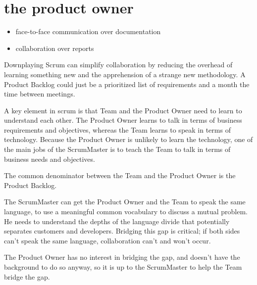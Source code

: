 \pagebreak
\chapter{the product owner}


\begin{itemize}
  \item face-to-face communication over documentation
  \item collaboration over reports
\end{itemize}

Downplaying Scrum can simplify collaboration by reducing the overhead of learning something new and the apprehension of a strange new methodology. A Product Backlog could just be a prioritized list of requirements and a month the time between meetings.


A key element in scrum is that Team and the Product Owner need to learn to understand each other.
The Product Owner learns to talk in terms of business requirements and objectives, whereas the Team learns to speak in terms of technology. Because the Product Owner is unlikely to learn the technology, one of the main jobs of the ScrumMaster is to teach the Team to talk in terms of business needs and objectives.

The common denominator between the Team and the Product Owner is the Product Backlog. 

The ScrumMaster can get the Product Owner and the Team to speak the same language, to use a meaningful common vocabulary to discuss a mutual problem. He needs to understand the depths of the language divide that potentially separates customers and developers. Bridging this gap is critical; if both sides can't speak the same language, collaboration can't and won't occur.

The Product Owner has no interest in bridging the gap, and doesn't have the background to do so anyway, so it is up to the ScrumMaster to help the Team bridge the gap.

